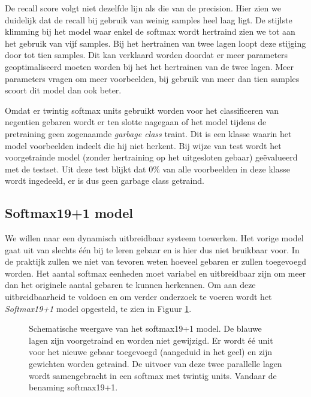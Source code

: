 \npar De recall score volgt niet dezelfde lijn als die van de precision. Hier zien we duidelijk dat de recall bij gebruik van weinig samples heel laag ligt. De stijlste klimming bij het model waar enkel de softmax wordt hertraind zien we tot aan het gebruik van vijf samples. Bij het hertrainen van twee lagen loopt deze stijging door tot tien samples. Dit kan verklaard worden doordat er meer parameters geoptimaliseerd moeten worden bij het het hertrainen van de twee lagen. Meer parameters vragen om meer voorbeelden, bij gebruik van meer dan tien samples scoort dit model dan  ook beter.

\npar Omdat er twintig softmax units gebruikt worden voor het classificeren van negentien gebaren wordt er ten slotte nagegaan of het model tijdens de pretraining geen zogenaamde \textit{garbage class} traint. Dit is een klasse waarin het model voorbeelden indeelt die hij niet herkent. Bij wijze van test wordt het voorgetrainde model (zonder hertraining op het uitgesloten gebaar) ge\"evalueerd met de testset. Uit deze test blijkt dat 0\% van alle voorbeelden in deze klasse wordt ingedeeld, er is dus geen garbage class getraind. 

\subsection{Softmax19+1 model}\label{sec:softmax19x1}
We willen naar een dynamisch uitbreidbaar systeem toewerken. Het vorige model gaat uit van slechts \'e\'en bij te leren gebaar en is hier dus niet bruikbaar voor. In de praktijk zullen we niet van tevoren weten hoeveel gebaren er zullen toegevoegd worden. Het aantal softmax eenheden moet variabel en uitbreidbaar zijn om meer dan het originele aantal gebaren te kunnen herkennen. Om aan deze uitbreidbaarheid te voldoen en om verder onderzoek te voeren wordt het \textit{Softmax19+1} model opgesteld, te zien in Figuur \ref{fig:19+1}.

\begin{figure}
	\centering
	\def\svgwidth{0.7\columnwidth}
	
	\caption{Schematische weergave van het softmax19+1 model. De blauwe lagen zijn voorgetraind en worden niet gewijzigd. Er wordt \'e\'e unit voor het nieuwe gebaar toegevoegd (aangeduid in het geel) en zijn gewichten worden getraind. De uitvoer van deze twee parallelle lagen wordt samengebracht in een softmax met twintig units. Vandaar de benaming softmax19+1.}\label{fig:19+1}
\end{figure}

